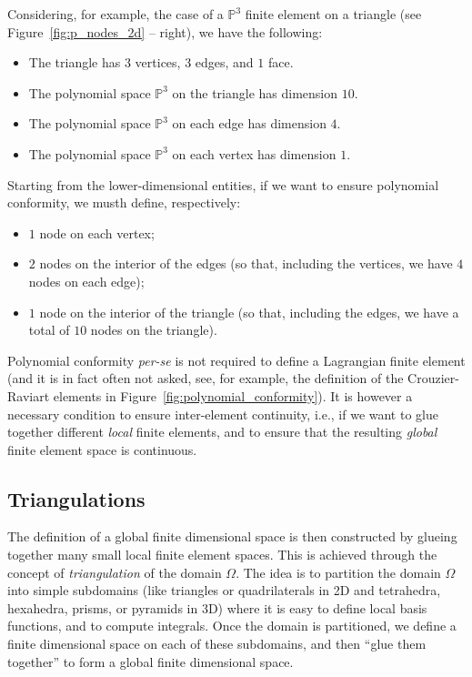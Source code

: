 Considering, for example, the case of a $\mathbb{P}^3$ finite element on a triangle (see Figure~\ref{fig:p_nodes_2d} -- right), we have the following:
\begin{itemize}
\item The triangle has $3$ vertices, $3$ edges, and $1$ face.
\item The polynomial space $\mathbb{P}^3$ on the triangle has dimension $10$.
\item The polynomial space $\mathbb{P}^3$ on each edge has dimension $4$.
\item The polynomial space $\mathbb{P}^3$ on each vertex has dimension $1$.
\end{itemize}

Starting from the lower-dimensional entities, if we want to ensure polynomial conformity, we musth define, respectively:
\begin{itemize}
\item $1$ node on each vertex;
\item $2$ nodes on the interior of the edges (so that, including the vertices, we have $4$ nodes on each edge);
\item $1$ node on the interior of the triangle (so that, including the edges, we have a total of $10$ nodes on the triangle).
\end{itemize}

\begin{remark}
Polynomial conformity \emph{per-se} is not required to define a Lagrangian finite element (and it is in fact often not asked, see, for example, the definition of the Crouzier-Raviart elements in Figure~\ref{fig:polynomial_conformity}). It is however a necessary condition to ensure inter-element continuity, i.e., if we want to glue together different \emph{local} finite elements, and to ensure that the resulting \emph{global} finite element space is continuous.
\end{remark}

\subsection{Triangulations}

The definition of a global finite dimensional space is then constructed by
glueing together many small local finite element spaces. This is achieved
through the concept of \emph{triangulation} of the domain $\Omega$. The idea is
to partition the domain $\Omega$ into simple subdomains (like triangles or
quadrilaterals in 2D and tetrahedra, hexahedra, prisms, or pyramids in 3D) where
it is easy to define local basis functions, and to compute integrals. Once the domain is partitioned, we
define a finite dimensional space on each of these subdomains, and then ``glue them together'' to form a global finite dimensional space.

